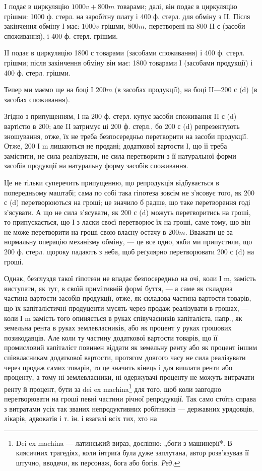 \parcont{}  %
I подає в циркуляцію $1000 v + 800 m$ товарами; далі, він подає
в циркуляцію грішми: 1000 ф. стерл. на заробітну плату і 400 ф. стерл.
для обміну з II. Після закінчення обміну І має: $1000 v$ грішми, $800 m$,
перетворені на 800 II с (засоби споживання), і 400 ф. стерл. грішми.

II подає в циркуляцію 1800 с товарами (засобами споживання) і
400 ф. стерл. грішми; після закінчення обміну він має: 1800 товарами І
(засобами продукції) і 400 ф. стерл. грішми.

Тепер ми маємо ще на боці І $200 m$ (в засобах продукції), на боці
II—200 с (d) (в засобах споживання).

Згідно з припущенням, І на 200 ф. стерл. купує засоби споживання
II с (d) вартістю в 200; але II затримує ці 200 ф. стерл., бо 200 с (d)
репрезентують зношування, отже, їх не треба безпосередньо перетворити
на засоби продукції. Отже, 200 І m лишаються не продані;
 додаткової вартости І, що її треба замістити, не сила реалізувати, не
сила перетворити з її натуральної форми засобів продукції на натуральну
форму засобів споживання.

Це не тільки суперечить припущенню, що репродукція відбувається
в попередньому маштабі; сама по собі така гіпотеза зовсім не з’ясовує
того, як 200 с (d) перетворюються на гроші; це значило б радше, що
таке перетворення годі з’ясувати. А що не сила з’ясувати, як 200 с (d)
можуть перетворитись на гроші, то припускається, що І з ласки своєї
перетворює їх на гроші, саме тому, що він не може перетворити на гроші
свою власну остачу в $200 m$. Вважати це за нормальну операцію механізму
обміну, — це все одно, якби ми припустили, що 200 ф. стерл.
щороку падають з неба, щоб реґулярно перетворювати 200 с (d) на гроші.

Однак, безглуздя такої гіпотези не впадає безпосередньо на очі, коли І m,
замість виступати, як тут, в своїй примітивній формі буття, — а саме як
складова частина вартости засобів продукції, отже, як складова частина
вартости товарів, що їх капіталістичні продуценти мусять через продаж
реалізувати в грошах, — коли І m замість того опиняється в руках співучасників
капіталіста, напр., як земельна рента в руках землевласників,
або як процент у руках грошових позикодавців. Але коли ту частину додаткової
вартости товарів, що її промисловий капіталіст повинен віддати
як земельну ренту або як процент іншим співвласникам додаткової вартости,
протягом довгого часу не сила реалізувати через продаж самих
товарів, то це значить кінець і для виплати ренти або проценту, а тому
ні землевласники, ні одержувачі проценту не можуть витрачати ренту й
процент, бути за dei ex machina\footnote*{
Dei ex machina — латинський вираз, дослівно: „боги з машинерії*. В клясичних
трагедіях, коли інтриґа була дуже заплутана, автор розв’язував її штучно,
вводячи, як персонаж, бога або богів. \emph{Ред.}
} для того, щоб коли завгодно перетворювати
на гроші певні частини річної репродукції. Так само стоїть
справа з витратами усіх так званих непродуктивних робітників — державних
урядовців, лікарів, адвокатів і т. ін. і взагалі всіх тих, хто на
\parbreak{}  %

